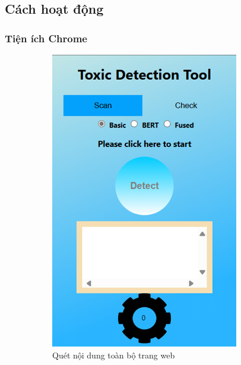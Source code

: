 \subsection{Cách hoạt động}

\subsubsection{Tiện ích Chrome}
\begin{figure}[htb!]
    \centering
    \begin{subfigure}[b]{0.33\textwidth}
        \centering
        \includegraphics[width=0.9\textwidth]{image/ex_web.png}
        \caption{Quét nội dung toàn bộ trang web}
        \label{figure:ex_web}
    \end{subfigure}%
    \begin{subfigure}[b]{0.33\textwidth}
        \centering

\end{subfigure}
\end{figure}
